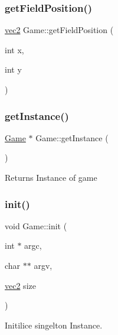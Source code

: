 \subsubsection{\texorpdfstring{get\+Field\+Position()}{getFieldPosition()}}
{\footnotesize\ttfamily \hyperlink{structvec2}{vec2} Game\+::get\+Field\+Position (\begin{DoxyParamCaption}\item[{int}]{x,  }\item[{int}]{y }\end{DoxyParamCaption})\hspace{0.3cm}{\ttfamily [private]}}

\mbox{\label{classGame_a19798a4f4c50037e1c5cd8c5d491fef9}} 
\subsubsection{\texorpdfstring{get\+Instance()}{getInstance()}}
{\footnotesize\ttfamily \hyperlink{classGame}{Game} $\ast$ Game\+::get\+Instance (\begin{DoxyParamCaption}{ }\end{DoxyParamCaption})\hspace{0.3cm}{\ttfamily [static]}}

\begin{DoxyReturn}{Returns}
Instance of game 
\end{DoxyReturn}
\mbox{\label{classGame_a512ae0e27fd506ed300d975ed3a18f73}} 
\subsubsection{\texorpdfstring{init()}{init()}}
{\footnotesize\ttfamily void Game\+::init (\begin{DoxyParamCaption}\item[{int $\ast$}]{argc,  }\item[{char $\ast$$\ast$}]{argv,  }\item[{\hyperlink{structvec2}{vec2}}]{size }\end{DoxyParamCaption})\hspace{0.3cm}{\ttfamily [static]}}

Initilice singelton Instance. \mbox{\label{classGame_a6c5b84f9376ef6ce1ed2c0eeb551ff71}} 
